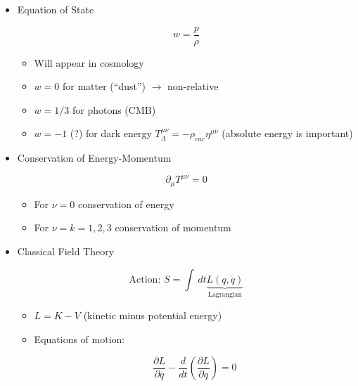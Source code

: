 \begin{itemize}
\begin{itemize}
\begin{itemize}
\begin{itemize}
            \end{itemize}

        \end{itemize}

    \end{itemize}

  \item Equation of State

    $$w=\frac{p}{\rho}$$

    \begin{itemize}

      \item Will appear in cosmology

      \item $w=0$ for matter (``dust'') $\to$ non-relative

      \item $w=1/3$ for photons (CMB)

      \item $w=-1$ (?) for dark energy $T_{\Lambda}^{\mu\nu}=-\rho_{vac}\eta^{\mu\nu}$ (absolute energy is important)

    \end{itemize}

  \item Conservation of Energy-Momentum

    $$\partial_{\mu}T^{\mu\nu}=0$$

    \begin{itemize}

      \item For $\nu=0$ conservation of energy

      \item For $\nu=k=1,2,3$ conservation of momentum

    \end{itemize}

  \item Classical Field Theory

    $$\text{Action: }S=\int\,dt \underbrace{L(q,\dot{q})}_{\text{Lagrangian}}$$

    \begin{itemize}

      \item $L=K-V$ (kinetic minus potential energy)

      \item Equations of motion:

        $$\frac{\partial L}{\partial q}-\frac{d}{dt}\left( \frac{\partial L}{\partial q} \right)=0$$


\end{itemize}
\end{itemize}
